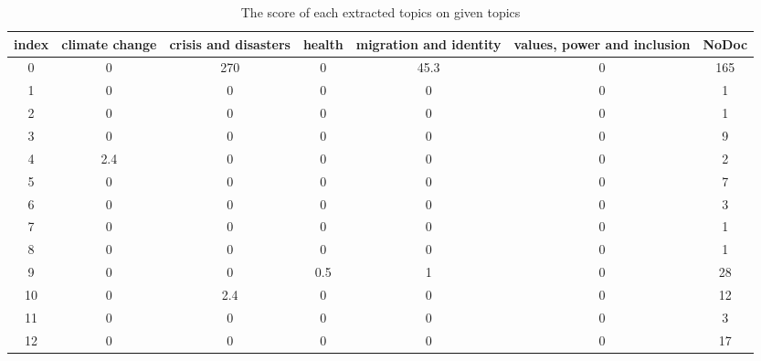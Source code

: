 \documentclass[sigchi]{acmart}
\begin{document}
\begin{table*}[t]
\centering
\begin{tabular}{|c|c|c|c|c|c|c|}
\hline
index & climate change & crisis and disasters & health & migration and identity & values, power and inclusion & NoDoc \\ \hline
0     & 0              & 270                  & 0      & 45.3                   & 0                           & 165   \\ \hline
1     & 0              & 0                    & 0      & 0                      & 0                           & 1     \\ \hline
2     & 0              & 0                    & 0      & 0                      & 0                           & 1     \\ \hline
3     & 0              & 0                    & 0      & 0                      & 0                           & 9     \\ \hline
4     & 2.4            & 0                    & 0      & 0                      & 0                           & 2     \\ \hline
5     & 0              & 0                    & 0      & 0                      & 0                           & 7     \\ \hline
6     & 0              & 0                    & 0      & 0                      & 0                           & 3     \\ \hline
7     & 0              & 0                    & 0      & 0                      & 0                           & 1     \\ \hline
8     & 0              & 0                    & 0      & 0                      & 0                           & 1     \\ \hline
9     & 0              & 0                    & 0.5    & 1                      & 0                           & 28    \\ \hline
10    & 0              & 2.4                  & 0      & 0                      & 0                           & 12    \\ \hline
11    & 0              & 0                    & 0      & 0                      & 0                           & 3     \\ \hline
12    & 0              & 0                    & 0      & 0                      & 0                           & 17    \\ \hline
\end{tabular}
\caption{The score of each extracted topics on given topics}
\label{tab:1}
\end{table*}
\end{document}
